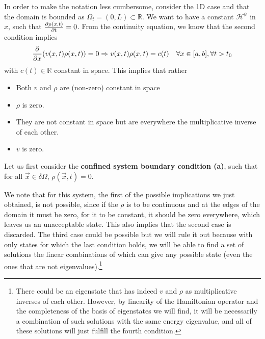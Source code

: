 \documentclass[11pt, a4paper]{article} %
\newcommand{\R}{\mathbb{R}} %
\newcommand{\h}{\mathcal{H}}
\DeclareRobustCommand{\mybox}[2][gray!10]{%
\begin{tcolorbox}[   %
        left=0.2cm,
        right=0.2cm,
        top=0.15cm,
        bottom=0.15cm,
        colback=#1,
        colframe=#1,
        width=\dimexpr\textwidth\relax, 
        enlarge left by=0mm,
        boxsep=5pt,
        arc=0pt,outer arc=0pt,
        ]
        #2
\end{tcolorbox}
}
\begin{document}
\mybox{
In order to make the notation less cumbersome, consider the 1D case and that the domain is bounded as $\Omega_t=(0,L)\subset \R$. We want to have a constant $\h^\psi$ in $x$, such that $\pdv{\rho(x,t)}{t}=0$. From the continuity equation, we know that the second condition implies
\begin{equation}
\pdv{}{x}\qty(v(x,t)\rho(x,t))=0\Rightarrow v(x,t)\rho(x,t)=c(t) \quad \forall x\in[a,b], \forall t>t_0
\end{equation}
with $c(t)\in\R$ constant in space. This implies that rather 
\begin{itemize}
\item Both $v$ and $\rho$ are (non-zero) constant in space
\item $\rho$ is zero.
\item They are not constant in space but are everywhere the multiplicative inverse of each other.
\item $v$ is zero.
\end{itemize}
Let us first consider the {\bf confined system boundary condition (a)}, such that for all $\vec{x}\in\delta \Omega$, $\rho(\vec{x},t)=0$. 

We note that for this system, the first of the possible implications we just obtained, is not possible, since if the $\rho$ is to be continuous and at the edges of the domain it must be zero, for it to be constant, it should be zero everywhere, which leaves us an unacceptable state. This also implies that the second case is discarded. The third case could be possible but we will rule it out because with only states for which the last condition holds, we will be able to find a set of solutions the linear combinations of which can give any possible state (even the ones that are not eigenvalues).\footnote{There could be an eigenstate that has indeed $v$ and $\rho$ as multiplicative inverses of each other. However, by linearity of the Hamiltonian operator and the completeness of the basis of eigenstates we will find, it will be necessarily a combination of such solutions with the same energy eigenvalue, and all of these solutions will just fulfill the fourth condition.}}
\end{document}
